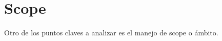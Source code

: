 \chapter{Scope} %

\label{ch:scope} %

Otro de los puntos claves a analizar es el manejo de scope o ámbito. 






